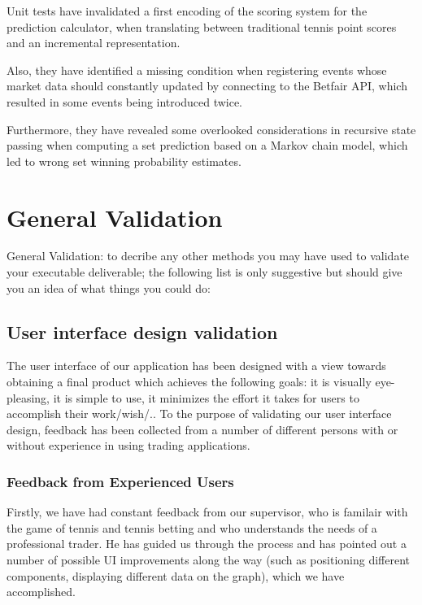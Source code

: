 \documentclass[10pt]{article}
\begin{document}
Unit tests have invalidated a first encoding of the scoring system for the prediction calculator, when translating between traditional tennis point scores and an incremental representation.

Also, they have identified a missing condition when registering events whose market data should constantly updated by connecting to the Betfair API, which resulted in some events being introduced twice.

Furthermore, they have revealed some overlooked considerations in recursive state passing when computing a set prediction based on a Markov chain model, which led to wrong set winning probability estimates. 

\clearpage

\section{General Validation}

General Validation: to decribe any other methods you may have used to validate your executable deliverable; the following list is only suggestive but should give you an idea of what things you could do:

\subsection{User interface design validation}

The user interface of our application has been designed with a view towards obtaining a final product which achieves the following goals: it is visually eye-pleasing, it is simple to use, it minimizes the effort it takes for users to accomplish their work/wish/..
To the purpose of validating our user interface design, feedback has been collected from a number of different persons with or without experience in using trading applications.

\subsubsection{Feedback from Experienced Users}

Firstly, we have had constant feedback from our supervisor, who is familair with the game of tennis and tennis betting and who understands the needs of a professional trader. He has guided us through the process and has pointed out a number of possible UI improvements along the way (such as positioning different components, displaying different data on the graph), which we have accomplished.
\end{document}
